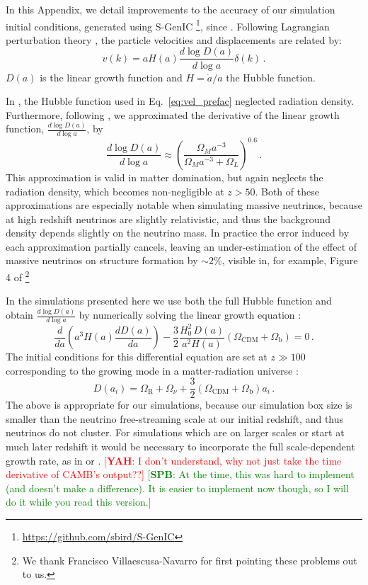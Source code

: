 \documentclass[useAMS, usenatbib]{mnras}
\newcommand{\spb}[1]{{\textcolor{green}{[{\bf SPB}: #1]}}}
\newcommand{\yah}[1]{{\textcolor{red}{[{\bf YAH}: #1]}}}
\begin{document}
In this Appendix, we detail improvements to the accuracy of our simulation initial conditions, generated using S-GenIC \footnote{\url{https://github.com/sbird/S-GenIC}}, since \cite{AHB}.
Following Lagrangian perturbation theory \citep{Zeldovich_1970, Scoccimarro_1998},
the particle velocities and displacements are related by:
\begin{equation}
v(k) = a H(a) \frac{d \log D(a)}{d \log a} \delta(k)\,.
\label{eq:vel_prefac}
\end{equation}
$D(a)$ is the linear growth function and $H = \dot{a}/a$ the Hubble function.

In \cite{AHB}, the Hubble function used in Eq.~\ref{eq:vel_prefac}
neglected radiation density. Furthermore, following \cite{Bouchet:1995}, we
approximated the derivative of the linear growth function, $\frac{d \log D(a)}{d \log a}$, by
\begin{equation}
\frac{d \log D(a)}{d \log a} \approx \left(\frac{\Omega_M a^{-3}}{\Omega_M  a^{-3} + \Omega_L}\right)^{0.6}\,.
\end{equation}
This approximation is valid in matter domination, but again neglects the radiation density,
which becomes non-negligible at $z > 50$. Both of these approximations are especially notable
when simulating massive neutrinos, because at high redshift neutrinos are slightly relativistic,
and thus the background density depends slightly on the neutrino mass. In practice the error
induced by each approximation partially cancels, leaving an under-estimation of the effect of
massive neutrinos on structure formation by $\sim 2 \%$, visible in, for example,
Figure 4 of \cite{AHB}\footnote{We thank Francisco Villaescusa-Navarro for first pointing these problems out to us.}

In the simulations presented here we use both the full Hubble function
and obtain $\frac{d \log D(a)}{d \log a}$ by numerically solving
the linear growth equation \citep{Peebles:1993}:
\begin{equation}
\frac{d}{da}\left(a^3 H(a) \frac{d D(a)}{da}\right) - \frac{3}{2} \frac{H_0^2\,D(a)}{a^2 H(a)} \left(\Omega_\mathrm{CDM} + \Omega_\mathrm{b}\right)= 0\,.
\end{equation}
The initial conditions for this differential equation are set at $z \gg 100$ corresponding
to the growing mode in a matter-radiation universe \citep{Groth:1975}:
\begin{equation}
  D(a_i) = \Omega_\mathrm{R} + \Omega_\nu + \frac{3}{2} \left(\Omega_\mathrm{CDM} + \Omega_\mathrm{b}\right) a_i\,.
\end{equation}
The above is appropriate for our simulations, because our simulation box size is smaller than the neutrino free-streaming scale at our initial redshift, and thus neutrinos do not cluster. For simulations which are on larger scales or start at much later redshift it would be necessary to incorporate the full scale-dependent growth rate, as in \cite{Zennaro_2017} or \cite{OLeary_2012}. \yah{I don't understand, why not just take the time derivative of CAMB's output??} \spb{At the time, this was hard to implement (and doesn't make a difference). It is easier to implement now though, so I will do it while you read this version.}
\end{document}
